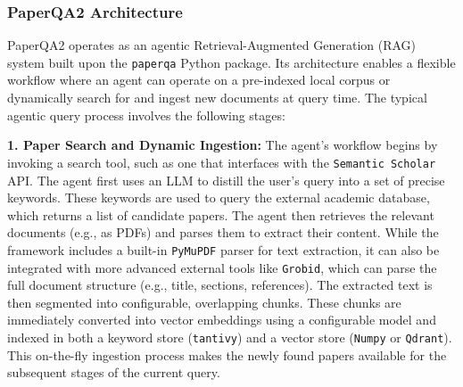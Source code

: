 \subsubsection{PaperQA2 Architecture}
PaperQA2 operates as an agentic Retrieval-Augmented Generation (RAG) system built upon the \texttt{paperqa} Python package. Its architecture enables a flexible workflow where an agent can operate on a pre-indexed local corpus or dynamically search for and ingest new documents at query time. The typical agentic query process involves the following stages:

\textbf{1. Paper Search and Dynamic Ingestion:}
The agent's workflow begins by invoking a search tool, such as one that interfaces with the \texttt{Semantic Scholar} API. The agent first uses an LLM to distill the user's query into a set of precise keywords. These keywords are used to query the external academic database, which returns a list of candidate papers. The agent then retrieves the relevant documents (e.g., as PDFs) and parses them to extract their content. While the framework includes a built-in \texttt{PyMuPDF} parser for text extraction, it can also be integrated with more advanced external tools like \texttt{Grobid}, which can parse the full document structure (e.g., title, sections, references). The extracted text is then segmented into configurable, overlapping chunks. These chunks are immediately converted into vector embeddings using a configurable model and indexed in both a keyword store (\texttt{tantivy}) and a vector store (\texttt{Numpy} or \texttt{Qdrant}). This on-the-fly ingestion process makes the newly found papers available for the subsequent stages of the current query.


